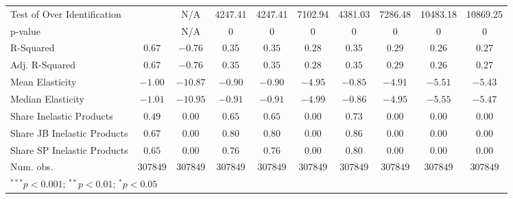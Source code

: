 \begin{tabular}{l c c c c c c c c c}
Test of Over Identification &               & N/A           & 4247.41       & 4247.41       & 7102.94       & 4381.03       & 7286.48       & 10483.18      & 10869.25      \\
p-value                     &               & N/A           & 0             & 0             & 0             & 0             & 0             & 0             & 0             \\
R-Squared                   & $0.67$        & $-0.76$       & $0.35$        & $0.35$        & $0.28$        & $0.35$        & $0.29$        & $0.26$        & $0.27$        \\
Adj. R-Squared              & $0.67$        & $-0.76$       & $0.35$        & $0.35$        & $0.28$        & $0.35$        & $0.29$        & $0.26$        & $0.27$        \\
Mean Elasticity             & $-1.00$       & $-10.87$      & $-0.90$       & $-0.90$       & $-4.95$       & $-0.85$       & $-4.91$       & $-5.51$       & $-5.43$       \\
Median Elasticity           & $-1.01$       & $-10.95$      & $-0.91$       & $-0.91$       & $-4.99$       & $-0.86$       & $-4.95$       & $-5.55$       & $-5.47$       \\
Share Inelastic Products    & $0.49$        & $0.00$        & $0.65$        & $0.65$        & $0.00$        & $0.73$        & $0.00$        & $0.00$        & $0.00$        \\
Share JB Inelastic Products & $0.67$        & $0.00$        & $0.80$        & $0.80$        & $0.00$        & $0.86$        & $0.00$        & $0.00$        & $0.00$        \\
Share SP Inelastic Products & $0.65$        & $0.00$        & $0.76$        & $0.76$        & $0.00$        & $0.80$        & $0.00$        & $0.00$        & $0.00$        \\
Num. obs.                   & $307849$      & $307849$      & $307849$      & $307849$      & $307849$      & $307849$      & $307849$      & $307849$      & $307849$      \\
\bottomrule
\multicolumn{10}{l}{\scriptsize{$^{***}p<0.001$; $^{**}p<0.01$; $^{*}p<0.05$}}
\end{tabular}
